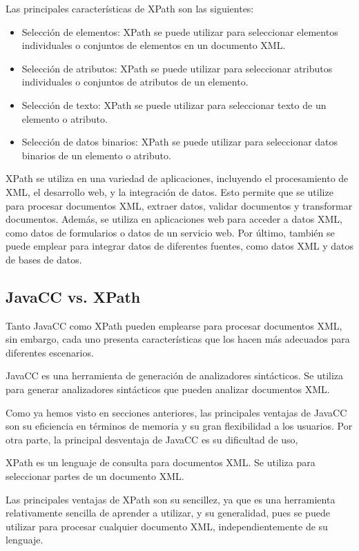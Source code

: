 Las principales características de XPath son las siguientes:

\begin{itemize}
  \item Selección de elementos: XPath se puede utilizar para seleccionar elementos individuales o conjuntos de elementos en un documento XML.
  \item Selección de atributos: XPath se puede utilizar para seleccionar atributos individuales o conjuntos de atributos de un elemento.
  \item Selección de texto: XPath se puede utilizar para seleccionar texto de un elemento o atributo.
  \item Selección de datos binarios: XPath se puede utilizar para seleccionar datos binarios de un elemento o atributo.
\end{itemize}

XPath se utiliza en una variedad de aplicaciones, incluyendo el procesamiento de XML, el desarrollo web, y la integración de datos. Esto permite que se utilize para procesar documentos XML, extraer datos, validar documentos y transformar documentos. Además, se utiliza en aplicaciones web para acceder a datos XML, como datos de formularios o datos de un servicio web. Por último, también se puede emplear para integrar datos de diferentes fuentes, como datos XML y datos de bases de datos.

\subsection{JavaCC vs. XPath}

\noindent Tanto JavaCC como XPath pueden emplearse para procesar documentos XML, sin embargo, cada uno presenta características que los hacen más adecuados para diferentes escenarios.

JavaCC es una herramienta de generación de analizadores sintácticos. Se utiliza para generar analizadores sintácticos que pueden analizar documentos XML.

Como ya hemos visto en secciones anteriores, las principales ventajas de JavaCC son su eficiencia en términos de memoria y su gran flexibilidad a los usuarios. Por otra parte, la principal desventaja de JavaCC es su dificultad de uso,

XPath es un lenguaje de consulta para documentos XML. Se utiliza para seleccionar partes de un documento XML.

Las principales ventajas de XPath son su sencillez, ya que es una herramienta relativamente sencilla de aprender a utilizar, y su generalidad, pues se puede utilizar para procesar cualquier documento XML, independientemente de su lenguaje.

